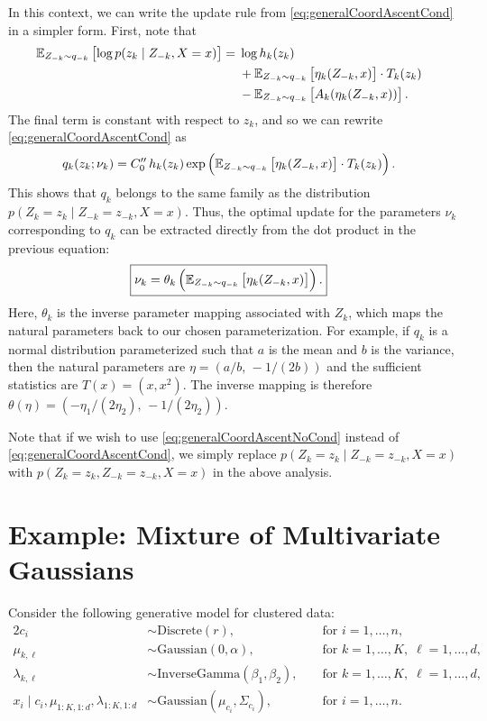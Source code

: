 \documentclass[11pt]{article}
\newcommand{\Discrete}{\mathrm{Discrete}}
\newcommand{\Gaussian}{\mathrm{Gaussian}}
\newcommand{\InverseGamma}{\mathrm{InverseGamma}}
\begin{document}
In this context, we can write the update rule from \eqref{eq:generalCoordAscentCond} in a simpler form.
First, note that
\begin{align}
\mathbb{E}_{\substack{Z_{-k} \sim q_{-k}}}\left[  \log p(z_k \mid Z_{-k}, X = x)  \right]
&= \begin{aligned}[t]
    &\log h_k(z_k) \\
    &+ \mathbb{E}_{\substack{Z_{-k} \sim q_{-k}}}\left[  \eta_k(Z_{-k}, x)  \right] \cdot T_k(z_k) \\
    &- \mathbb{E}_{\substack{Z_{-k} \sim q_{-k}}}\left[  A_k(\eta_k(Z_{-k}, x))  \right].
    \end{aligned}
\end{align}
The final term is constant with respect to $z_k$, and so we can rewrite \eqref{eq:generalCoordAscentCond} as
\begin{align}
q_k(z_k; \nu_k)
&=
C''_0 \, h_k(z_k) \exp\left( \mathbb{E}_{\substack{Z_{-k} \sim q_{-k}}}\left[ \eta_k(Z_{-k}, x) \right] \cdot T_k(z_k) \right).
\end{align}
This shows that $q_k$ belongs to the same family as the distribution $p(Z_k = z_k \mid Z_{-k} = z_{-k}, X = x)$.
Thus, the optimal update for the parameters $\nu_k$ corresponding to $q_k$ can be extracted directly from the dot product in the previous equation:
\begin{align}
\label{eq:paramUpdate}
\Aboxed{
\nu_k
&=
\theta_k \left(
    \expectOver{Z_{-k} \sim q_{-k}}{ \eta_k(Z_{-k}, x) }
\right).
}
\end{align}
Here, $\theta_k$ is the inverse parameter mapping associated with $Z_k$, which maps the natural parameters back to our chosen parameterization.
For example, if $q_k$ is a normal distribution parameterized such that $a$ is the mean and $b$ is the variance, then the natural parameters are $\eta = (a/b, \, -1/(2b))$ and the sufficient statistics are $T(x) = (x, x^2)$.
The inverse mapping is therefore $\theta(\eta) = (-\eta_1/(2\eta_2), \, -1/(2 \eta_2))$.

Note that if we wish to use \eqref{eq:generalCoordAscentNoCond} instead of \eqref{eq:generalCoordAscentCond},
we simply replace $p(Z_k = z_k \mid Z_{-k} = z_{-k}, X = x)$ with $p(Z_k = z_k, Z_{-k} = z_{-k}, X = x)$ in the above analysis.

\section{Example: Mixture of Multivariate Gaussians}

Consider the following generative model for clustered data:
\begin{alignat}{2}
c_i &\sim \Discrete(r), &&\text{ for } i = 1, \ldots, n, \\
\mu_{k, \ell} &\sim \Gaussian(0, \alpha), &&\text{ for } k = 1, \ldots, K, \; \ell = 1, \ldots, d, \\
\lambda_{k, \ell} &\sim \InverseGamma(\beta_1, \beta_2), &&\text{ for } k = 1, \ldots, K, \; \ell = 1, \ldots, d, \\
x_i \mid c_i, \mu_{1:K,1:d}, \lambda_{1:K,1:d} &\sim \Gaussian(\mu_{c_i}, \Sigma_{c_i}), &&\text{ for } i = 1, \ldots, n.
\end{alignat}
\end{document}
